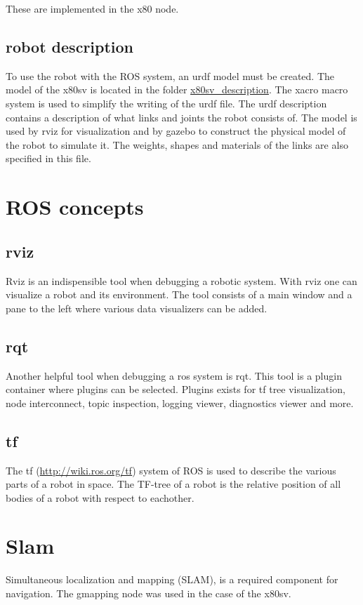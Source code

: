 \documentclass[a4paper]{article}
\begin{document}
These are implemented in the x80 node.

\subsection{robot description}
To use the robot with the ROS system, an urdf model must be created. The model of the x80sv is
located in the folder \url{x80sv_description}. The xacro macro system is used to simplify the
writing of the urdf file. The urdf description contains a description of what links and joints
the robot consists of. The model is used by rviz for visualization and by gazebo to construct
the physical model of the robot to simulate it. The weights, shapes and materials of the links
are also specified in this file.

\section{ROS concepts}
\subsection{rviz}
Rviz is an indispensible tool when debugging a robotic system. With rviz one can visualize a robot
and its environment. The tool consists of a main window and a pane to the left where various data
visualizers can be added.

\subsection{rqt}
Another helpful tool when debugging a ros system is rqt. This tool is a plugin container where plugins
can be selected. Plugins exists for tf tree visualization, node interconnect, topic inspection,
logging viewer, diagnostics viewer and more.

\subsection{tf}
The tf (\url{http://wiki.ros.org/tf}) system of ROS is used to describe the various parts of 
a robot in space. The TF-tree of a robot is the relative position of all bodies of a robot
with respect to eachother.

\section{Slam}
Simultaneous localization and mapping (SLAM), is a required component for navigation.
The gmapping node was used in the case of the x80sv.
\end{document}
